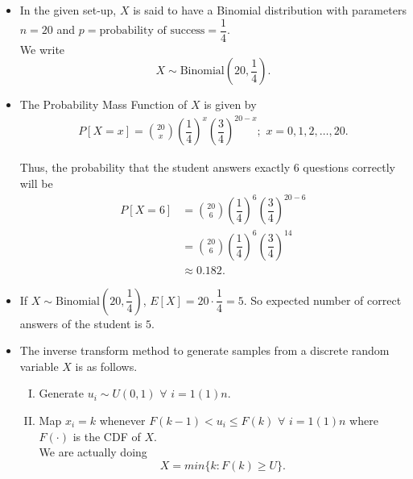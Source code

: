 \documentclass[11pt, a4paper]{article}\usepackage[]{graphicx}\usepackage[]{xcolor}
\begin{document}
\begin{itemize}
\item[\scalebox{2.0}{\twemoji{keycap: 1}}] \hspace{0.1cm} In the given set-up, $X$ is said to have a Binomial distribution with parameters $n = 20$ and $p = \text{probability of success} = \dfrac{1}{4}$. \\[0.2em]

We write $$X \sim \text{Binomial}\left(20, \dfrac{1}{4}\right).$$

\item[\scalebox{2.0}{\twemoji{keycap: 2}}] \hspace{0.1cm} The Probability Mass Function of $X$ is given by 
\begin{align*}
P[X = x] = \binom{20}{x} \left(\dfrac{1}{4}\right)^x \left(\dfrac{3}{4}\right)^{20-x}; \,\, x = 0, 1, 2, \ldots, 20.
\end{align*}

Thus, the probability that the student answers exactly $6$ questions correctly will be
\begin{align*}
P[X = 6] &= \binom{20}{6} \left(\dfrac{1}{4}\right)^6 \left(\dfrac{3}{4}\right)^{20-6} \\[0.4em]
&= \binom{20}{6} \left(\dfrac{1}{4}\right)^6 \left(\dfrac{3}{4}\right)^{14} \\[0.4em]
&\approx 0.182.
\end{align*}

\item[\scalebox{2.0}{\twemoji{keycap: 3}}] \hspace{0.1cm} If $X \sim \text{Binomial}\left(20, \dfrac{1}{4}\right)$, $E[X] = 20 \cdot \dfrac{1}{4} = 5$. So expected number of correct answers of the student is $5$.

\item[\scalebox{2.0}{\twemoji{keycap: 4}}] \hspace{0.1cm} The inverse transform method to generate samples from a discrete random variable $X$ is as follows.
\begin{enumerate}[I.]
\item Generate $u_i \sim U(0, 1)$ $\forall$ $i = 1(1)n$.
\item Map $x_i = k$ whenever $F(k-1) < u_i \leq F(k)$ $\forall$ $i = 1(1)n$ where $F(\cdot)$ is the CDF of $X$. \\[0.2em] We are actually doing $$X = min\{k : F(k) \geq U\}.$$
\end{enumerate}
\end{itemize}
\end{document}

